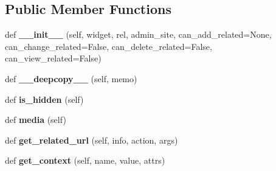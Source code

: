 \subsection*{Public Member Functions}
\begin{DoxyCompactItemize}
\item 
\mbox{\label{classdjango_1_1contrib_1_1admin_1_1widgets_1_1_related_field_widget_wrapper_a15f3d646551dc0aed87d83c146189136}} 
def {\bfseries \+\_\+\+\_\+init\+\_\+\+\_\+} (self, widget, rel, admin\+\_\+site, can\+\_\+add\+\_\+related=None, can\+\_\+change\+\_\+related=False, can\+\_\+delete\+\_\+related=False, can\+\_\+view\+\_\+related=False)
\item 
\mbox{\label{classdjango_1_1contrib_1_1admin_1_1widgets_1_1_related_field_widget_wrapper_ad065c20a49a827c7ec7a58d107b9c7a0}} 
def {\bfseries \+\_\+\+\_\+deepcopy\+\_\+\+\_\+} (self, memo)
\item 
\mbox{\label{classdjango_1_1contrib_1_1admin_1_1widgets_1_1_related_field_widget_wrapper_a005c6338d4cfc8841464ef656b35bcd7}} 
def {\bfseries is\+\_\+hidden} (self)
\item 
\mbox{\label{classdjango_1_1contrib_1_1admin_1_1widgets_1_1_related_field_widget_wrapper_a5c9afc4c73f7678b5d99e70832afc386}} 
def {\bfseries media} (self)
\item 
\mbox{\label{classdjango_1_1contrib_1_1admin_1_1widgets_1_1_related_field_widget_wrapper_acdbf0e055cf51cb23cd0ca7f43b963f0}} 
def {\bfseries get\+\_\+related\+\_\+url} (self, info, action, args)
\item 
\mbox{\label{classdjango_1_1contrib_1_1admin_1_1widgets_1_1_related_field_widget_wrapper_aaeafe461ef645e3c6a47bc830e82b944}} 
def {\bfseries get\+\_\+context} (self, name, value, attrs)
\item 
\mbox{\label{classdjango_1_1contrib_1_1admin_1_1widgets_1_1_related_field_widget_wrapper_a3846032bce405f53bbc2ede3569d2660}} 

\end{DoxyCompactItemize}
